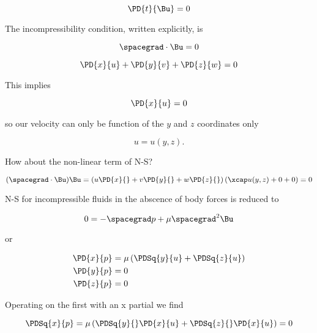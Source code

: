\begin{equation}\label{eqn:continuumL11:210}
\PD{t}{\Bu} = 0
\end{equation}

The incompressibility condition, written explicitly, is

\begin{equation}\label{eqn:continuumL11:230}
\spacegrad \cdot \Bu = 0
\end{equation}

\begin{equation}\label{eqn:continuumL11:250}
\PD{x}{u} + \PD{y}{v} + \PD{z}{w} = 0
\end{equation}

This implies 

\begin{equation}\label{eqn:continuumL11:270}
\PD{x}{u} = 0
\end{equation}

so our velocity can only be function of the $y$ and $z$ coordinates only

\begin{equation}\label{eqn:continuumL11:290}
u = u(y, z).
\end{equation}

How about the non-linear term of N-S?

\begin{equation}\label{eqn:continuumL11:510}
(\spacegrad \cdot \Bu) \Bu
=
\left(u \PD{x}{}
+v \PD{y}{}
+w \PD{z}{} \right) (\xcap u( y, z) + 0 + 0 )
= 0
\end{equation}

N-S for incompressible fluids in the abscence of body forces is reduced to

\begin{equation}\label{eqn:continuumL11:310}
0 = - \spacegrad p + \mu \spacegrad^2 \Bu 
\end{equation}

or

\begin{align}\label{eqn:continuumL11:330}
\PD{x}{p} &= \mu \left( \PDSq{y}{u} + \PDSq{z}{u} \right) \\
\PD{y}{p} &= 0 \\
\PD{z}{p} &= 0 
\end{align}

Operating on the first with an x partial we find

\begin{equation}\label{eqn:continuumL11:350}
\PDSq{x}{p} = \mu \left( \PDSq{y}{} \PD{x}{u} + \PDSq{z}{}\PD{x}{u} \right) = 0
\end{equation}


